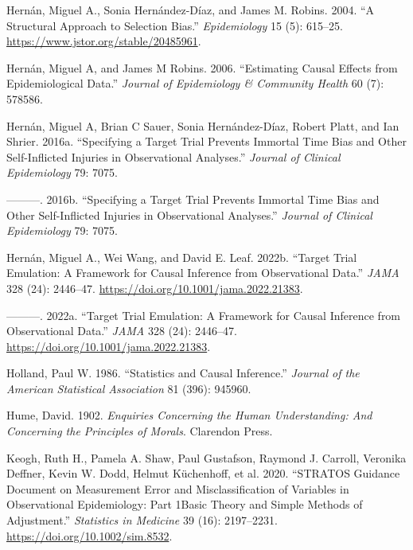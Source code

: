 \documentclass[
  singlecolumn]{article}
\newlength{\cslhangindent}
\newlength{\cslentryspacingunit} %
\newenvironment{CSLReferences}[2] %
 {%
  \setlength{\parindent}{0pt}
  \ifodd #1
  \let\oldpar\par
  \def\par{\hangindent=\cslhangindent\oldpar}
  \fi
  \setlength{\parskip}{#2\cslentryspacingunit}
 }%
 {}
\begin{document}
\begin{CSLReferences}{1}{0}
\leavevmode{}%
Hernán, Miguel A., Sonia Hernández-Díaz, and James M. Robins. 2004. {``A
Structural Approach to Selection Bias.''} \emph{Epidemiology} 15 (5):
615--25. \url{https://www.jstor.org/stable/20485961}.

\leavevmode{}%
Hernán, Miguel A, and James M Robins. 2006. {``Estimating Causal Effects
from Epidemiological Data.''} \emph{Journal of Epidemiology \& Community
Health} 60 (7): 578586.

\leavevmode{}%
Hernán, Miguel A, Brian C Sauer, Sonia Hernández-Díaz, Robert Platt, and
Ian Shrier. 2016a. {``Specifying a Target Trial Prevents Immortal Time
Bias and Other Self-Inflicted Injuries in Observational Analyses.''}
\emph{Journal of Clinical Epidemiology} 79: 7075.

\leavevmode{}%
---------. 2016b. {``Specifying a Target Trial Prevents Immortal Time
Bias and Other Self-Inflicted Injuries in Observational Analyses.''}
\emph{Journal of Clinical Epidemiology} 79: 7075.

\leavevmode{}%
Hernán, Miguel A., Wei Wang, and David E. Leaf. 2022b. {``Target Trial
Emulation: A Framework for Causal Inference from Observational Data.''}
\emph{JAMA} 328 (24): 2446--47.
\url{https://doi.org/10.1001/jama.2022.21383}.

\leavevmode{}%
---------. 2022a. {``Target Trial Emulation: A Framework for Causal
Inference from Observational Data.''} \emph{JAMA} 328 (24): 2446--47.
\url{https://doi.org/10.1001/jama.2022.21383}.

\leavevmode{}%
Holland, Paul W. 1986. {``Statistics and Causal Inference.''}
\emph{Journal of the American Statistical Association} 81 (396): 945960.

\leavevmode{}%
Hume, David. 1902. \emph{Enquiries Concerning the Human Understanding:
And Concerning the Principles of Morals}. Clarendon Press.

\leavevmode{}%
Keogh, Ruth H., Pamela A. Shaw, Paul Gustafson, Raymond J. Carroll,
Veronika Deffner, Kevin W. Dodd, Helmut Küchenhoff, et al. 2020.
{``STRATOS Guidance Document on Measurement Error and Misclassification
of Variables in Observational Epidemiology: Part 1{\textemdash}Basic
Theory and Simple Methods of Adjustment.''} \emph{Statistics in
Medicine} 39 (16): 2197--2231. \url{https://doi.org/10.1002/sim.8532}.


\end{CSLReferences}
\end{document}

